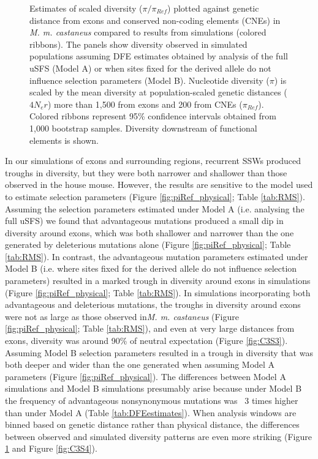  \begin{figure}[H]
   \centering      
   \noindent{}
 \caption[Reductions in diversity caused by background selection and selective sweeps in simulated data - genetic distance]{Estimates of scaled diversity ($\pi / \pi_{Ref}$) plotted against genetic distance from exons and conserved non-coding elements (CNEs) in \textit{M. m. castaneus} compared to results from simulations (colored ribbons). The panels show diversity observed in simulated populations assuming DFE estimates obtained by analysis of the full uSFS (Model A) or when sites fixed for the derived allele do not influence selection parameters (Model B). Nucleotide diversity ($\pi$) is scaled by the mean diversity at population-scaled genetic distances ($4N_er$) more than 1,500 from exons and 200 from CNEs ($\pi_{Ref}$). Colored ribbons represent 95\% confidence intervals obtained from 1,000 bootstrap samples. Diversity downstream of functional elements is shown.}
 \label{fig:piRef_genetic}
\end{figure}

	In our simulations of exons and surrounding regions, recurrent SSWs produced troughs in diversity, but they were both narrower and shallower than those observed in the house mouse. However, the results are sensitive to the model used to estimate selection parameters (Figure \ref{fig:piRef_physical}; Table \ref{tab:RMS}). Assuming the selection parameters estimated under Model A (i.e. analysing the full uSFS) we found that advantageous mutations produced a small dip in diversity around exons, which was both shallower and narrower than the one generated by deleterious mutations alone (Figure \ref{fig:piRef_physical}; Table \ref{tab:RMS}). In contrast, the advantageous mutation parameters estimated under Model B (i.e. where sites fixed for the derived allele do not influence selection parameters) resulted in a marked trough in diversity around exons in simulations (Figure \ref{fig:piRef_physical}; Table \ref{tab:RMS}). In simulations incorporating both advantageous and deleterious mutations, the troughs in diversity around exons were not as large as those observed in\textit{M. m. castaneus} (Figure \ref{fig:piRef_physical}; Table \ref{tab:RMS}), and even at very large distances from exons, diversity was around 90\% of neutral expectation (Figure \ref{fig:C3S3}). Assuming Model B selection parameters resulted in a trough in diversity that was both deeper and wider than the one generated when assuming Model A parameters (Figure \ref{fig:piRef_physical}). The differences between Model A simulations and Model B simulations presumably arise because under Model B the frequency of advantageous nonsynonymous mutations was ~3 times higher than under Model A (Table \ref{tab:DFEestimates}). When analysis windows are binned based on genetic distance rather than physical distance, the differences between observed and simulated diversity patterns are even more striking (Figure \ref{fig:piRef_genetic} and Figure \ref{fig:C3S4}). 


